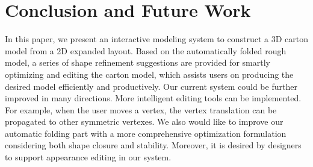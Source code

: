 \documentclass[submission]{gmp2018}
\begin{document}









\section{Conclusion and Future Work}\label{sec:conclusion}
In this paper, we present an interactive modeling system to construct a 3D carton model from a 2D expanded layout. 
Based on the automatically folded rough model, a series of shape refinement suggestions are provided for smartly optimizing and editing the carton model, which assists users on producing the desired model efficiently and productively. 
%
Our current system could be further improved in many directions. 
More intelligent editing tools can be implemented. For example, when the user moves a vertex, the vertex translation can be propagated to other symmetric vertexes.
We also would like to improve our automatic folding part with a more comprehensive optimization formulation considering both shape closure and stability. 
%
Moreover, it is desired by designers to support appearance editing in our system.
%




\end{document}
